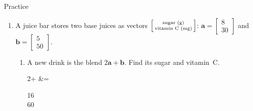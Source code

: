 \documentclass[10pt]{article}
\begin{document}
\begin{notesbox}{Practice}
\begin{enumerate}[leftmargin=1.9em, itemsep=10pt]
\begin{enumerate}[label=(\alph*), leftmargin=1.8em, itemsep=4pt]
      \item $\begin{bsmallmatrix} 2 \\ 1 \end{bsmallmatrix},\ \begin{bsmallmatrix} 1 \\ 3 \end{bsmallmatrix}$ \hfill
      \item $\begin{bsmallmatrix} 4 \\ -2 \end{bsmallmatrix},\ \begin{bsmallmatrix} -2 \\ 1 \end{bsmallmatrix}$
    \end{enumerate}
  \item A juice bar stores two base juices as vectors
        $\begin{bsmallmatrix} \text{sugar (g)} \\ \text{vitamin C (mg)} \end{bsmallmatrix}$:
        $\mathbf{a}=\begin{bmatrix} 8 \\ 30 \end{bmatrix}$ and
        $\mathbf{b}=\begin{bmatrix} 5 \\ 50 \end{bmatrix}$.
    \begin{enumerate}[label=(\alph*), leftmargin=1.8em, itemsep=5pt]
      \item A new drink is the blend $2\mathbf{a}+\mathbf{b}$. Find its sugar and vitamin~C.
\begin{work}
  2+ &= \begin{bsmallmatrix} 16 \\ 60 \end{bsmallmatrix}

\end{work}
\end{enumerate}
\end{enumerate}
\end{notesbox}
\end{document}
